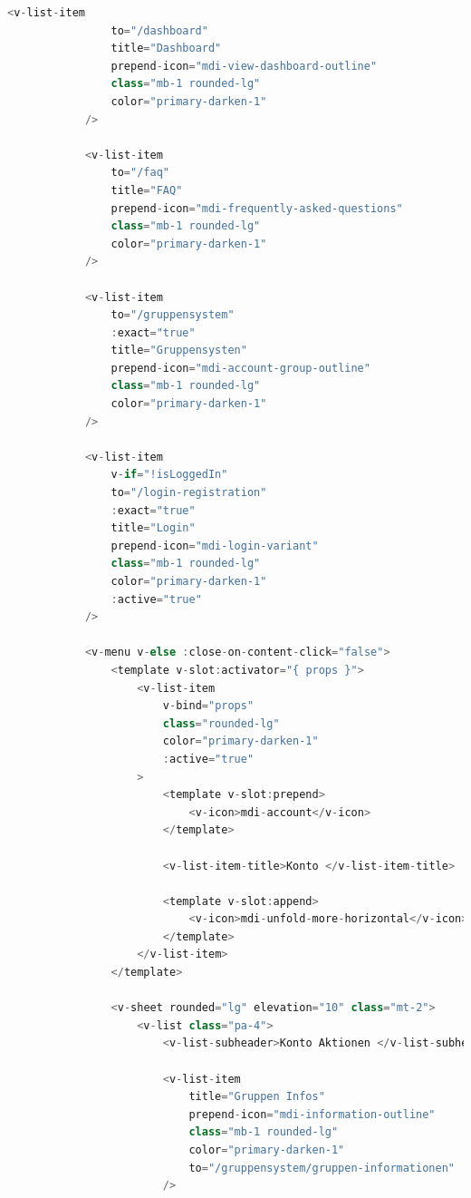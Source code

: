 \begin{lstlisting}[language={JavaScript}, caption={Navigationsleiste für Web als auch Mobile}]
            <v-list-item
                to="/dashboard"
                title="Dashboard"
                prepend-icon="mdi-view-dashboard-outline"
                class="mb-1 rounded-lg"
                color="primary-darken-1"
            />

            <v-list-item
                to="/faq"
                title="FAQ"
                prepend-icon="mdi-frequently-asked-questions"
                class="mb-1 rounded-lg"
                color="primary-darken-1"
            />

            <v-list-item
                to="/gruppensystem"
                :exact="true"
                title="Gruppensysten"
                prepend-icon="mdi-account-group-outline"
                class="mb-1 rounded-lg"
                color="primary-darken-1"
            />

            <v-list-item
                v-if="!isLoggedIn"
                to="/login-registration"
                :exact="true"
                title="Login"
                prepend-icon="mdi-login-variant"
                class="mb-1 rounded-lg"
                color="primary-darken-1"
                :active="true"
            />

            <v-menu v-else :close-on-content-click="false">
                <template v-slot:activator="{ props }">
                    <v-list-item
                        v-bind="props"
                        class="rounded-lg"
                        color="primary-darken-1"
                        :active="true"
                    >
                        <template v-slot:prepend>
                            <v-icon>mdi-account</v-icon>
                        </template>

                        <v-list-item-title>Konto </v-list-item-title>

                        <template v-slot:append>
                            <v-icon>mdi-unfold-more-horizontal</v-icon>
                        </template>
                    </v-list-item>
                </template>

                <v-sheet rounded="lg" elevation="10" class="mt-2">
                    <v-list class="pa-4">
                        <v-list-subheader>Konto Aktionen </v-list-subheader>

                        <v-list-item
                            title="Gruppen Infos"
                            prepend-icon="mdi-information-outline"
                            class="mb-1 rounded-lg"
                            color="primary-darken-1"
                            to="/gruppensystem/gruppen-informationen"
                        />


\end{lstlisting}
